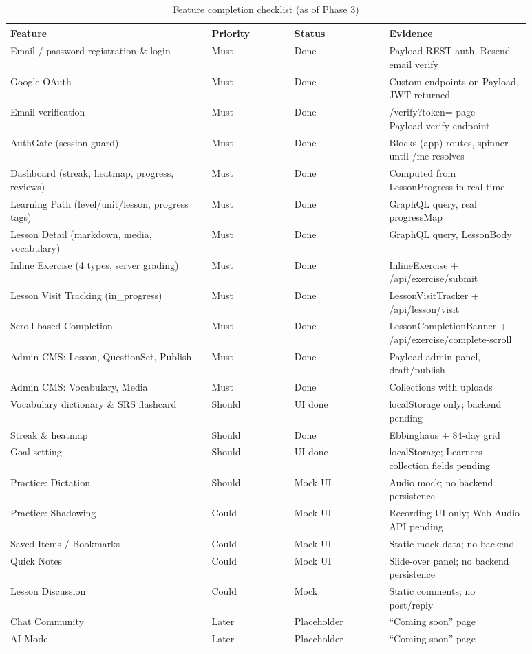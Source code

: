 \begin{longtable}{p{0.34\linewidth} p{0.14\linewidth} p{0.16\linewidth} p{0.24\linewidth}}
\caption{Feature completion checklist (as of Phase 3)}\\
\toprule
Feature & Priority & Status & Evidence \\
\midrule
\endhead
Email / password registration \& login & Must & Done & Payload REST auth, Resend email verify \\
Google OAuth & Must & Done & Custom endpoints on Payload, JWT returned \\
Email verification & Must & Done & /verify?token= page + Payload verify endpoint \\
AuthGate (session guard) & Must & Done & Blocks (app) routes, spinner until /me resolves \\
Dashboard (streak, heatmap, progress, reviews) & Must & Done & Computed from LessonProgress in real time \\
Learning Path (level/unit/lesson, progress tags) & Must & Done & GraphQL query, real progressMap \\
Lesson Detail (markdown, media, vocabulary) & Must & Done & GraphQL query, LessonBody \\
Inline Exercise (4 types, server grading) & Must & Done & InlineExercise + /api/exercise/submit \\
Lesson Visit Tracking (in\_progress) & Must & Done & LessonVisitTracker + /api/lesson/visit \\
Scroll-based Completion & Must & Done & LessonCompletionBanner + /api/exercise/complete-scroll \\
Admin CMS: Lesson, QuestionSet, Publish & Must & Done & Payload admin panel, draft/publish \\
Admin CMS: Vocabulary, Media & Must & Done & Collections with uploads \\
Vocabulary dictionary \& SRS flashcard & Should & UI done & localStorage only; backend pending \\
Streak \& heatmap & Should & Done & Ebbinghaus + 84-day grid \\
Goal setting & Should & UI done & localStorage; Learners collection fields pending \\
Practice: Dictation & Should & Mock UI & Audio mock; no backend persistence \\
Practice: Shadowing & Could & Mock UI & Recording UI only; Web Audio API pending \\
Saved Items / Bookmarks & Could & Mock UI & Static mock data; no backend \\
Quick Notes & Could & Mock UI & Slide-over panel; no backend persistence \\
Lesson Discussion & Could & Mock & Static comments; no post/reply \\
Chat Community & Later & Placeholder & ``Coming soon'' page \\
AI Mode & Later & Placeholder & ``Coming soon'' page \\
\bottomrule
\end{longtable}

